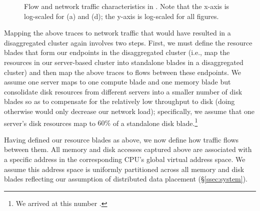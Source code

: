 \begin{figure}
{	\label{fig:fsdp}
  }
  \caption{\small{Flow and network traffic characteristics in \dis. Note that the x-axis is log-scaled for (a) and (d); the y-axis is log-scaled for all figures. }}
  \label{fig:traffic}
\end{figure}
%

Mapping the above traces to network traffic that would have resulted 
in a disaggregated cluster again involves two steps. First, we must 
define the resource blades that form our endpoints in the disaggregated cluster (i.e., map the resources in our server-based cluster into standalone blades in a disaggregated cluster) and then map the above traces to flows between these endpoints. 
We assume one server maps to one compute blade and one memory blade but consolidate disk resources from different servers into a smaller number of disk blades so as to compensate for the relatively low throughput to disk (doing otherwise would only decrease our network load); specifically, we 
assume that one server's disk resources map to $60\%$ of a standalone 
disk blade.\footnote{We arrived at this number .}

Having defined our resource blades as above, we now define how traffic 
flows between them. 
All memory and disk accesses captured above are associated with a specific address in the corresponding CPU's global virtual address space. We assume this address space is uniformly partitioned across all memory and disk blades reflecting our assumption of distributed data placement (\S\ref{ssec:system}).  

